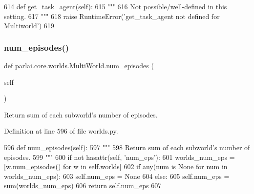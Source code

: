 \begin{DoxyCode}
614     \textcolor{keyword}{def }get\_task\_agent(self):
615         \textcolor{stringliteral}{"""}
616 \textcolor{stringliteral}{        Not possible/well-defined in this setting.}
617 \textcolor{stringliteral}{        """}
618         \textcolor{keywordflow}{raise} RuntimeError(\textcolor{stringliteral}{'get\_task\_agent not defined for Multiworld'})
619 
\end{DoxyCode}
\mbox{\label{classparlai_1_1core_1_1worlds_1_1MultiWorld_a3efde7408bd94052b0a4880aefbc5d0a}} 
\subsubsection{\texorpdfstring{num\+\_\+episodes()}{num\_episodes()}}
{\footnotesize\ttfamily def parlai.\+core.\+worlds.\+Multi\+World.\+num\+\_\+episodes (\begin{DoxyParamCaption}\item[{}]{self }\end{DoxyParamCaption})}

\begin{DoxyVerb}Return sum of each subworld's number of episodes.
\end{DoxyVerb}
 

Definition at line 596 of file worlds.\+py.


\begin{DoxyCode}
596     \textcolor{keyword}{def }num\_episodes(self):
597         \textcolor{stringliteral}{"""}
598 \textcolor{stringliteral}{        Return sum of each subworld's number of episodes.}
599 \textcolor{stringliteral}{        """}
600         \textcolor{keywordflow}{if} \textcolor{keywordflow}{not} hasattr(self, \textcolor{stringliteral}{'num\_eps'}):
601             worlds\_num\_eps = [w.num\_episodes() \textcolor{keywordflow}{for} w \textcolor{keywordflow}{in} self.worlds]
602             \textcolor{keywordflow}{if} any(num \textcolor{keywordflow}{is} \textcolor{keywordtype}{None} \textcolor{keywordflow}{for} num \textcolor{keywordflow}{in} worlds\_num\_eps):
603                 self.num\_eps = \textcolor{keywordtype}{None}
604             \textcolor{keywordflow}{else}:
605                 self.num\_eps = sum(worlds\_num\_eps)
606         \textcolor{keywordflow}{return} self.num\_eps
607 
\end{DoxyCode}
\mbox{\label{classparlai_1_1core_1_1worlds_1_1MultiWorld_ae62ad8500e4208ed99ffcf91707746e1}} 

